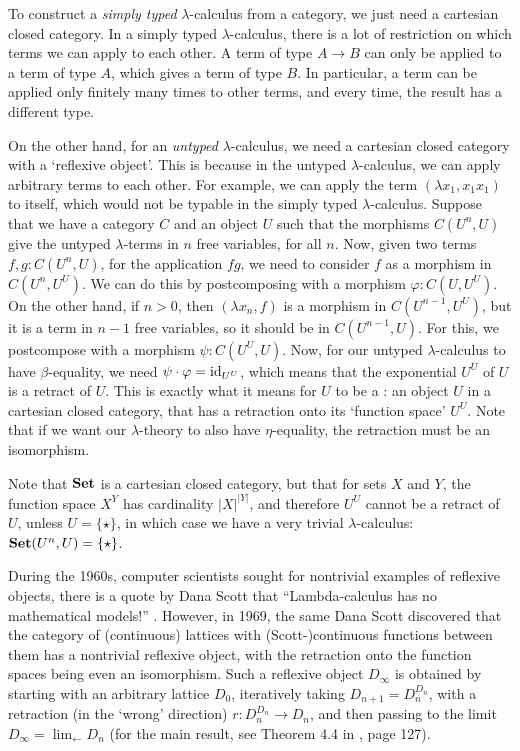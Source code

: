 \begin{remark}
  To construct a \textit{simply typed} $ \lambda $-calculus from a category, we just need a cartesian closed category. In a simply typed $ \lambda $-calculus, there is a lot of restriction on which terms we can apply to each other. A term of type $ A \to B $ can only be applied to a term of type $ A $, which gives a term of type $ B $. In particular, a term can be applied only finitely many times to other terms, and every time, the result has a different type.

  On the other hand, for an \textit{untyped} $ \lambda $-calculus, we need a cartesian closed category with a `reflexive object'. This is because in the untyped $ \lambda $-calculus, we can apply arbitrary terms to each other. For example, we can apply the term $ (\lambda x_1, x_1 x_1) $ to itself, which would not be typable in the simply typed $ \lambda $-calculus. Suppose that we have a category $ C $ and an object $ U $ such that the morphisms $ C(U^n, U) $ give the untyped $ \lambda $-terms in $ n $ free variables, for all $ n $. Now, given two terms $ f, g : C(U^n, U) $, for the application $ f g $, we need to consider $ f $ as a morphism in $ C(U^n, U^U) $. We can do this by postcomposing with a morphism $ \varphi: C(U, U^U) $. On the other hand, if $ n > 0 $, then $ (\lambda x_n, f) $ is a morphism in $ C(U^{n - 1}, U^U) $, but it is a term in $ n - 1 $ free variables, so it should be in $ C(U^{n - 1}, U) $. For this, we postcompose with a morphism $ \psi: C(U^U, U) $. Now, for our untyped $ \lambda $-calculus to have $ \beta $-equality, we need $ \psi \cdot \varphi = \text{id}_{U^U} $, which means that the exponential $ U^U $ of $ U $ is a retract of $ U $. This is exactly what it means for $ U $ to be a : an object $ U $ in a cartesian closed category, that has a retraction onto its `function space' $ U^U $. Note that if we want our $ \lambda $-theory to also have $ \eta $-equality, the retraction must be an isomorphism.

  Note that $ \mathbf{Set} $ is a cartesian closed category, but that for sets $ X $ and $ Y $, the function space $ X^Y $ has cardinality $ \vert X \vert^{\vert Y \vert} $, and therefore $ U^U $ cannot be a retract of $ U $, unless $ U = \{ \star \} $, in which case we have a very trivial $ \lambda $-calculus: $ \mathbf{Set}(U^n, U) = \{ \star \} $.

  During the 1960s, computer scientists sought for nontrivial examples of reflexive objects, there is a quote by Dana Scott that ``Lambda-calculus has no mathematical models!'' \autocite{strachey}. However, in 1969, the same Dana Scott discovered that the category of (continuous) lattices with (Scott-)continuous functions between them has a nontrivial reflexive object, with the retraction onto the function spaces being even an isomorphism. Such a reflexive object $ D_\infty $ is obtained by starting with an arbitrary lattice $ D_0 $, iteratively taking $ D_{n + 1} = D_n^{D_n} $, with a retraction (in the `wrong' direction) $ r: D_n^{D_n} \to D_n $, and then passing to the limit $ D_\infty = \lim_{\leftarrow} D_n $ (for the main result, see Theorem 4.4 in \autocite{scott-continuous}, page 127).
\end{remark}

